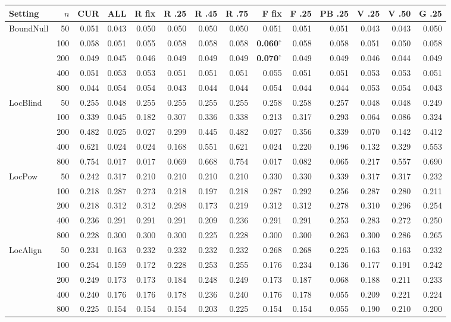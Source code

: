 \begin{tabular}{@{}lrrrrrrrrrrrrr@{}}
\toprule
Setting & $n$ & CUR & ALL & R fix & R .25 & R .45 & R .75 & F fix & F .25 & PB .25 & V .25 & V .50 & G .25\\
\midrule
BoundNull & 50 & 0.051 & 0.043 & 0.050 & 0.050 & 0.050 & 0.050 & 0.051 & 0.051 & 0.051 & 0.043 & 0.043 & 0.050\\
 & 100 & 0.058 & 0.051 & 0.055 & 0.058 & 0.058 & 0.058 & \textbf{0.060}$^{\uparrow}$ & 0.058 & 0.058 & 0.051 & 0.050 & 0.058\\
 & 200 & 0.049 & 0.045 & 0.046 & 0.049 & 0.049 & 0.049 & \textbf{0.070}$^{\uparrow}$ & 0.049 & 0.049 & 0.046 & 0.044 & 0.049\\
 & 400 & 0.051 & 0.053 & 0.053 & 0.051 & 0.051 & 0.051 & 0.055 & 0.051 & 0.051 & 0.053 & 0.053 & 0.051\\
 & 800 & 0.044 & 0.054 & 0.054 & 0.043 & 0.044 & 0.044 & 0.054 & 0.044 & 0.044 & 0.053 & 0.054 & 0.043\\
\addlinespace[2pt]
LocBlind & 50 & 0.255 & 0.048 & 0.255 & 0.255 & 0.255 & 0.255 & 0.258 & 0.258 & 0.257 & 0.048 & 0.048 & 0.249\\
 & 100 & 0.339 & 0.045 & 0.182 & 0.307 & 0.336 & 0.338 & 0.213 & 0.317 & 0.293 & 0.064 & 0.086 & 0.324\\
 & 200 & 0.482 & 0.025 & 0.027 & 0.299 & 0.445 & 0.482 & 0.027 & 0.356 & 0.339 & 0.070 & 0.142 & 0.412\\
 & 400 & 0.621 & 0.024 & 0.024 & 0.168 & 0.551 & 0.621 & 0.024 & 0.220 & 0.196 & 0.132 & 0.329 & 0.553\\
 & 800 & 0.754 & 0.017 & 0.017 & 0.069 & 0.668 & 0.754 & 0.017 & 0.082 & 0.065 & 0.217 & 0.557 & 0.690\\
\addlinespace[2pt]
LocPow & 50 & 0.242 & 0.317 & 0.210 & 0.210 & 0.210 & 0.210 & 0.330 & 0.330 & 0.339 & 0.317 & 0.317 & 0.232\\
 & 100 & 0.218 & 0.287 & 0.273 & 0.218 & 0.197 & 0.218 & 0.287 & 0.292 & 0.256 & 0.287 & 0.280 & 0.211\\
 & 200 & 0.218 & 0.312 & 0.312 & 0.298 & 0.173 & 0.219 & 0.312 & 0.312 & 0.278 & 0.310 & 0.296 & 0.254\\
 & 400 & 0.236 & 0.291 & 0.291 & 0.291 & 0.209 & 0.236 & 0.291 & 0.291 & 0.253 & 0.283 & 0.272 & 0.250\\
 & 800 & 0.228 & 0.300 & 0.300 & 0.300 & 0.225 & 0.228 & 0.300 & 0.300 & 0.263 & 0.300 & 0.286 & 0.265\\
\addlinespace[2pt]
LocAlign & 50 & 0.231 & 0.163 & 0.232 & 0.232 & 0.232 & 0.232 & 0.268 & 0.268 & 0.225 & 0.163 & 0.163 & 0.232\\
 & 100 & 0.254 & 0.159 & 0.172 & 0.228 & 0.253 & 0.255 & 0.176 & 0.234 & 0.136 & 0.177 & 0.191 & 0.242\\
 & 200 & 0.249 & 0.173 & 0.173 & 0.184 & 0.248 & 0.249 & 0.173 & 0.187 & 0.068 & 0.188 & 0.211 & 0.233\\
 & 400 & 0.240 & 0.176 & 0.176 & 0.178 & 0.236 & 0.240 & 0.176 & 0.178 & 0.055 & 0.209 & 0.221 & 0.224\\
 & 800 & 0.225 & 0.154 & 0.154 & 0.154 & 0.203 & 0.225 & 0.154 & 0.154 & 0.055 & 0.190 & 0.210 & 0.200\\
\bottomrule
\end{tabular}